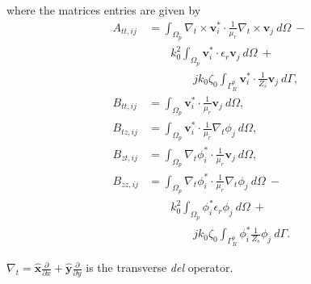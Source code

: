 %
\noindent where the matrices entries are given by
\begin{equation*}
\begin{aligned}
A_{tt,ij} &= \int_{\Omega_p} \nabla_t \times \mathbf{v}_i^*  \cdot \frac{1}{\mu_r} \nabla_t \times \mathbf{v}_j \ d\Omega \ - \\
 & \qquad k_0^2 \int_{\Omega_p} \mathbf{v}_i^*  \cdot \epsilon_r \mathbf{v}_j \ d\Omega \ + \\ 
&  \qquad \qquad j k_0 \zeta_0
\int_{\Gamma_R^p} \mathbf{v}_i^*  \cdot \frac{1}{Z_s} \mathbf{v}_j \ d\Gamma, \\
B_{tt,ij} &= \int_{\Omega_p} \mathbf{v}_i^*  \cdot  \frac{1}{\mu_r}\mathbf{v}_j \ d\Omega, \\
B_{tz,ij} &= \int_{\Omega_p} \mathbf{v}_i^*  \cdot  \frac{1}{\mu_r}\nabla_t \phi_j \ d\Omega, \\
B_{zt,ij} &= \int_{\Omega_p} \nabla_t \phi_i^*  \cdot  \frac{1}{\mu_r}\mathbf{v}_j \ d\Omega, \\
B_{zz,ij} &= \int_{\Omega_p} \nabla_t \phi_i^*  \cdot  \frac{1}{\mu_r}\nabla_t \phi_j \ d\Omega \ - \\
& \qquad k_0^2 \int_{\Omega_p} \phi_i^* \epsilon_r \phi_j \ d\Omega \ +\\
& \qquad \qquad j k_0 \zeta_0 \int_{\Gamma_R^p} \phi_i^* \frac{1}{Z_s} \phi_j \ d\Gamma.
\end{aligned}
\end{equation*}

\noindent $\nabla_t = \hat{\mathbf{x}} \frac{\partial}{\partial x} + \hat{\mathbf{y}} \frac{\partial}{\partial y}$ is the transverse \textit{del} operator.
%

